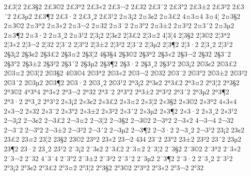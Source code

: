 {2^^a33^^a62
2^^a33^^a72
2^^a33^^a92
2^^a33^^aa2
2^^a33^^ab2
2^^a33^^ac2
2^^a33^^ad2
2^^a33^^af2
2^^a33^^b02
2^^a33^^b12
2^^a33^^b22
2^^a33^^b42
2^^a33^^b52
2^^a33^^b62
2^^a33^^b72
2^^a33^^b82
2^^a33^^b92
2^^a43^^a12
2^^a43^^a22
2^^a43^^a32
4^^a43^^a44
3^^a44^^a6
2^^a43^^a72
2^^a43^^a92
2^^a43^^aa2
2^^a43^^ab2
2^^a43^^ac2
2^^a43^^ad2
2^^a43^^af2
2^^a43^^b02
2^^a43^^b12
2^^a43^^b22
2^^a43^^b42
2^^a43^^b52
2^^a43^^b62
2^^a43^^b72
2^^a43^^b82
2^^a43^^b92
2^^a63^^a12
2^^a63^^a22
2^^a63^^a32
2^^a63^^a42
4^^a63^^a64
2^^a63^^a72
2^^a63^^a92
2^^a63^^aa2
2^^a63^^ab2
2^^a63^^ac2
2^^a63^^ad2
2^^a63^^af2
2^^a63^^b02
2^^a63^^b12
2^^a63^^b22
2^^a63^^b42
2^^a63^^b52
2^^a63^^b62
2^^a63^^b72
2^^a63^^b82
2^^a63^^b92
2^^a73^^a12
2^^a73^^a22
2^^a73^^a32
2^^a73^^a42
2^^a73^^a62
4^^a73^^a74
2^^a73^^a92
2^^a73^^aa2
2^^a73^^ab2
2^^a73^^ac2
2^^a73^^ad2
2^^a73^^af2
2^^a73^^b02
2^^a73^^b12
2^^a73^^b22
2^^a73^^b42
2^^a73^^b52
2^^a73^^b62
2^^a73^^b72
2^^a73^^b82
2^^a73^^b92
2^^a93^^a12
2^^a93^^a22
2^^a93^^a32
2^^a93^^a42
2^^a93^^a62
2^^a93^^a72
4^^a93^^a94
2^^a93^^aa2
2^^a93^^ab2
2^^a93^^ac2
2^^a93^^ad2
2^^a93^^af2
2^^a93^^b02
2^^a93^^b12
2^^a93^^b22
2^^a93^^b42
2^^a93^^b52
2^^a93^^b62
2^^a93^^b72
2^^a93^^b82
2^^a93^^b92
2^^aa3^^a12
2^^aa3^^a22
2^^aa3^^a32
2^^aa3^^a42
2^^aa3^^a62
2^^aa3^^a72
2^^aa3^^a92
4^^aa3^^aa4
2^^aa3^^ab2
2^^aa3^^ac2
2^^aa3^^ad2
2^^aa3^^af2
2^^aa3^^b02
2^^aa3^^b12
2^^aa3^^b22
2^^aa3^^b42
2^^aa3^^b52
2^^aa3^^b62
2^^aa3^^b72
2^^aa3^^b82
2^^aa3^^b92
2^^ab3^^a12
2^^ab3^^a22
2^^ab3^^a32
2^^ab3^^a42
2^^ab3^^a62
2^^ab3^^a72
2^^ab3^^a92
2^^ab3^^aa2
4^^ab3^^ab4
2^^ab3^^ac2
2^^ab3^^ad2
2^^ab3^^af2
2^^ab3^^b02
2^^ab3^^b12
2^^ab3^^b22
2^^ab3^^b42
2^^ab3^^b52
2^^ab3^^b62
2^^ab3^^b72
2^^ab3^^b82
2^^ab3^^b92
2^^ac3^^a12
2^^ac3^^a22
2^^ac3^^a32
2^^ac3^^a42
2^^ac3^^a62
2^^ac3^^a72
2^^ac3^^a92
2^^ac3^^aa2
2^^ac3^^ab2
4^^ac3^^ac4
2^^ac3^^ad2
2^^ac3^^af2
2^^ac3^^b02
2^^ac3^^b12
2^^ac3^^b22
2^^ac3^^b42
2^^ac3^^b52
2^^ac3^^b62
2^^ac3^^b72
2^^ac3^^b82
2^^ac3^^b92
2^^ad3^^a12
2^^ad3^^a22
2^^ad3^^a32
2^^ad3^^a42
2^^ad3^^a62
2^^ad3^^a72
2^^ad3^^a92
2^^ad3^^aa2
2^^ad3^^ab2
2^^ad3^^ac2
4^^ad3^^ad4
2^^ad3^^af2
2^^ad3^^b02
2^^ad3^^b12
2^^ad3^^b22
2^^ad3^^b42
2^^ad3^^b52
2^^ad3^^b62
2^^ad3^^b72
2^^ad3^^b82
2^^ad3^^b92
2^^af3^^a12
2^^af3^^a22
2^^af3^^a32
2^^af3^^a42
2^^af3^^a62
2^^af3^^a72
2^^af3^^a92
2^^af3^^aa2
2^^af3^^ab2
2^^af3^^ac2
2^^af3^^ad2
4^^af3^^af4
2^^af3^^b02
2^^af3^^b12
2^^af3^^b22
2^^af3^^b42
2^^af3^^b52
2^^af3^^b62
2^^af3^^b72
2^^af3^^b82
2^^af3^^b92
2^^b03^^a12
2^^b03^^a22
2^^b03^^a32
2^^b03^^a42
2^^b03^^a62
2^^b03^^a72
2^^b03^^a92
2^^b03^^aa2
2^^b03^^ab2
2^^b03^^ac2
2^^b03^^ad2
}
